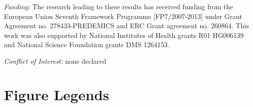 \documentclass[10pt]{article}
\begin{document}
\emph{Funding:} The research leading to these results has received funding from the European Union Seventh Framework Programme [FP7/2007-2013] under Grant Agreement no. 278433-PREDEMICS and ERC Grant agreement no. 260864.
This work was also supported by National Institutes of Health grants R01 HG006139 and National Science Foundation grants DMS 1264153.

\emph{Conflict of Interest:} none declared

\newpage

\section*{Figure Legends}
% 
% 
\end{document}

